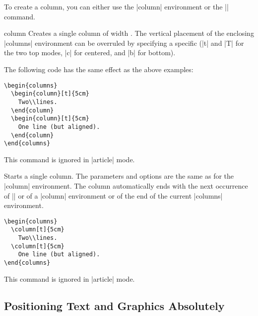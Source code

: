 To create a column, you can either use the |column| environment or the |\column| command.

\begin{environment}{{column}}
  Creates a single column of width . The vertical placement of the enclosing |columns| environment can be overruled by specifying a specific  (|t| and |T| for the two top modes, |c| for centered, and |b| for bottom).

  \example
  The following code has the same effect as the above examples:
\begin{verbatim}
\begin{columns}
  \begin{column}[t]{5cm}
    Two\\lines.
  \end{column}
  \begin{column}[t]{5cm}
    One line (but aligned).
  \end{column}
\end{columns}
\end{verbatim}

  \articlenote
  This command is ignored in |article| mode.

\end{environment}

\begin{command}{{\column}}
  Starts a single column. The parameters and options are the same as for the |column| environment. The column automatically ends with the next occurrence of |\column| or of a |column| environment or of the end of the current |columns| environment.

  \example
\begin{verbatim}
\begin{columns}
  \column[t]{5cm}
    Two\\lines.
  \column[t]{5cm}
    One line (but aligned).
\end{columns}
\end{verbatim}

  \articlenote
  This command is ignored in |article| mode.

\end{command}


\subsection{Positioning Text and Graphics Absolutely}

